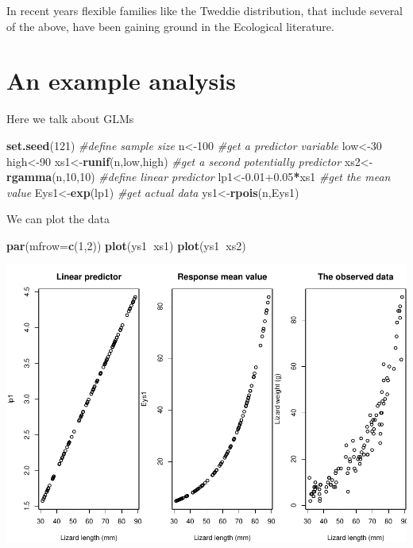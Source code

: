 \documentclass[
]{book}
\newenvironment{Shaded}{\begin{snugshade}}{\end{snugshade}}
\newcommand{\CommentTok}[1]{\textcolor[rgb]{0.56,0.35,0.01}{\textit{#1}}}
\newcommand{\DataTypeTok}[1]{\textcolor[rgb]{0.13,0.29,0.53}{#1}}
\newcommand{\DecValTok}[1]{\textcolor[rgb]{0.00,0.00,0.81}{#1}}
\newcommand{\FloatTok}[1]{\textcolor[rgb]{0.00,0.00,0.81}{#1}}
\newcommand{\KeywordTok}[1]{\textcolor[rgb]{0.13,0.29,0.53}{\textbf{#1}}}
\newcommand{\NormalTok}[1]{#1}
\newcommand{\OperatorTok}[1]{\textcolor[rgb]{0.81,0.36,0.00}{\textbf{#1}}}
\begin{document}
In recent years flexible families like the Tweddie distribution, that include several of the above, have been gaining ground in the Ecological literature.

\hypertarget{an-example-analysis}{%
\section{An example analysis}\label{an-example-analysis}}

Here we talk about GLMs

\begin{Shaded}
\begin{Highlighting}[]
\KeywordTok{set.seed}\NormalTok{(}\DecValTok{121}\NormalTok{)}
\CommentTok{#define sample size}
\NormalTok{n<-}\DecValTok{100}
\CommentTok{#get a predictor variable}
\NormalTok{low<-}\DecValTok{30}
\NormalTok{high<-}\DecValTok{90}
\NormalTok{xs1<-}\KeywordTok{runif}\NormalTok{(n,low,high)}
\CommentTok{#get a second potentially predictor}
\NormalTok{xs2<-}\KeywordTok{rgamma}\NormalTok{(n,}\DecValTok{10}\NormalTok{,}\DecValTok{10}\NormalTok{)}
\CommentTok{#define linear predictor}
\NormalTok{lp1<-}\FloatTok{0.01+0.05}\OperatorTok{*}\NormalTok{xs1}
\CommentTok{#get the mean value}
\NormalTok{Eys1<-}\KeywordTok{exp}\NormalTok{(lp1)}
\CommentTok{#get actual data}
\NormalTok{ys1<-}\KeywordTok{rpois}\NormalTok{(n,Eys1)}
\end{Highlighting}
\end{Shaded}

We can plot the data

\begin{Shaded}
\begin{Highlighting}[]
\KeywordTok{par}\NormalTok{(}\DataTypeTok{mfrow=}\KeywordTok{c}\NormalTok{(}\DecValTok{1}\NormalTok{,}\DecValTok{2}\NormalTok{))}
\KeywordTok{plot}\NormalTok{(ys1}\OperatorTok{~}\NormalTok{xs1)}
\KeywordTok{plot}\NormalTok{(ys1}\OperatorTok{~}\NormalTok{xs2)}
\end{Highlighting}
\end{Shaded}

\includegraphics{ECOMODbook_files/figure-latex/glm2-1.pdf}
\end{document}
